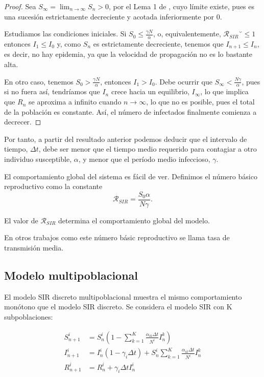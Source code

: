 \begin{proof}

Sea $S_\infty=\lim_{n\rightarrow\infty} S_n > 0$, por el Lema 1 de \cite{allenDiscretetimeSISIR1994}, cuyo límite existe, pues es una sucesión estrictamente decreciente y acotada inferiormente por $0$. 

Estudiamos las condiciones iniciales. Si $S_0\leq \frac{\gamma N}{\alpha}$, o, equivalentemente, $\mathcal{R}_{SIR}˘\leq 1$ entonces $I_1\leq I_0$ y, como $S_n$ es estrictamente decreciente, tenemos que $I_{n+1}\leq I_n$, es decir, no hay epidemia, ya que la velocidad de propagación no es lo bastante alta.

En otro caso, tenemos $S_0> \frac{\gamma N}{\alpha}$, entonces $I_1>I_0$. Debe ocurrir que $S_\infty <\frac{N\gamma}{\alpha}$, pues si no fuera así, tendríamos que $I_n$ crece hacia un equilibrio, $I_\infty$, lo que implica que $R_n$ se aproxima a infinito cuando $n\rightarrow\infty$, lo que no es posible, pues el total de la población es constante. Así, el número de infectados finalmente comienza a decrecer.
\end{proof}

Por tanto, a partir del resultado anterior podemos deducir que el intervalo de tiempo, $\Delta t$, debe ser menor que el tiempo medio requerido para contagiar a otro individuo susceptible, $\alpha$, y menor que el período medio infeccioso, $\gamma$.


El comportamiento global del sistema es fácil de ver. Definimos el número básico reproductivo como la constante 
$$\mathcal{R}_{SIR}=\frac{S_0 \alpha}{N\gamma }.$$

El valor de $\mathcal{R}_{SIR}$ determina el comportamiento global del modelo.

En otros trabajos como \cite{demongeotSIEpidemicModel} este número básic reproductivo se llama tasa de transmisión media.

\subsection{Modelo multipoblacional}

El modelo SIR discreto multipoblacional muestra el mismo comportamiento monótono que el modelo SIR discreto. Se considera el modelo SIR con K subpoblaciones:

\begin{equation}
\label{eqn: SIR multipoblational}
\begin{aligned}
S_{n+1}^i &= S_n^i \left( 1- \sum_{k=1}^{K} \frac{\alpha_{ik}\Delta t}{N^i}I_n^k \right) \\
I_{n+1}^i &= I_n^i (1-\gamma_i\Delta t) + S_n^i\sum_{k=1}^{K}\frac{\alpha_{ik}\Delta t}{N^i}I_n^k \\
R_{n+1}^i &= R_n^i+\gamma_i\Delta t I_n^i
\end {aligned}
\end{equation}

